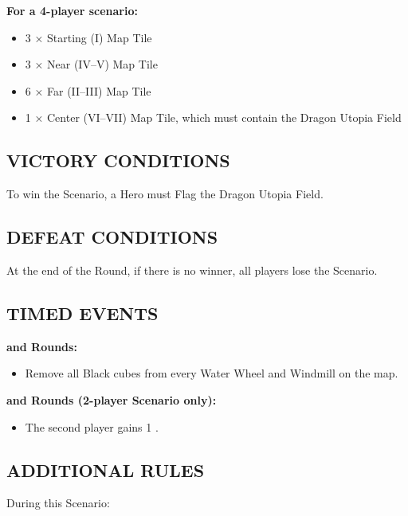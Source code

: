\begin{multicols*}{2}
\textbf{For a 4-player scenario:}
\begin{itemize}
  \item 3 × Starting (I) Map Tile
  \item 3 × Near (IV--V) Map Tile
  \item 6 × Far (II--III) Map Tile
  \item 1 × Center (VI--VII) Map Tile, which must contain the Dragon Utopia Field
\end{itemize}

\subsection*{\MakeUppercase{Victory Conditions}}
To win the Scenario, a Hero must Flag the Dragon Utopia Field.

\subsection*{\MakeUppercase{Defeat Conditions}}
At the end of the  Round, if there is no winner, all players lose the Scenario.

\subsection*{\MakeUppercase{Timed Events}}

\textbf{ and  Rounds:}
\begin{itemize}
  \item Remove all Black cubes from every Water Wheel and Windmill on the map.
\end{itemize}

\textbf{ and  Rounds (2-player Scenario only):}
\begin{itemize}
  \item The second player gains 1 .
\end{itemize}

\subsection*{\MakeUppercase{Additional Rules}}

During this Scenario:


\end{multicols*}
